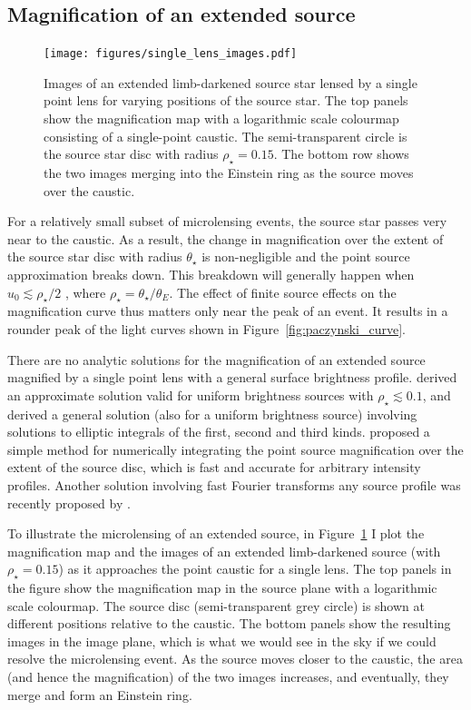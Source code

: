 \documentclass[12pt,dvipsnames]{report}
\begin{document}
\subsection{Magnification of an extended source}
\begin{figure}[t]
    \begin{centering}
        \texttt{[image: figures/single\_lens\_images.pdf]}
        \caption{Images of an extended limb-darkened source star lensed by a single
            point lens for varying positions of the source star. The top panels show the magnification map with a logarithmic scale
            colourmap  consisting of a single-point caustic. The semi-transparent circle
            is the source star disc with radius $\rho_\star=0.15$. The bottom row shows
            the two images merging into the Einstein ring as the source moves over the caustic.}
        \label{fig:single_lens_images}
    \end{centering}
\end{figure}
For a relatively small subset of microlensing events, the source star passes
very near to the caustic. 
As a result,  the change in magnification over the extent of
the source star disc with radius $\theta_\star$ is non-negligible and the point source
approximation breaks down. 
This breakdown will generally happen when $u_0 \lesssim
    \rho_\star/2$ \citep{1997ApJ...477..580G}, where
$\rho_\star=\theta_\star/\theta_E$. The effect of finite source effects on the
magnification curve thus matters only near the peak of an event.
It results in a rounder peak of the light curves shown in Figure~\ref{fig:paczynski_curve}.

There are no analytic solutions for the magnification of an
extended source magnified by a single point lens with a general surface brightness
profile. \citet{1994ApJ...421L..71G} derived an approximate solution valid for
uniform brightness sources with $\rho_\star\lesssim 0.1$, and
\citet{1994ApJ...430..505W} derived a general solution (also for a uniform
brightness source) involving solutions to elliptic integrals of the first,
second and third kinds. \citet{2009ApJ...695..200L} proposed a simple method for
numerically integrating the point source magnification over the extent of the source
disc, which is fast and accurate for arbitrary intensity profiles.
Another solution involving fast Fourier transforms any source profile was
recently proposed by \citet{2022arXiv220306637S}.

To illustrate the microlensing of an extended source,
in Figure~\ref{fig:single_lens_images} I plot the magnification map and the
images of an extended limb-darkened source (with $\rho_\star=0.15$) as it
approaches the point caustic for a single lens. The top panels in the figure show the
magnification map in the source plane with a logarithmic scale colourmap. The
source disc (semi-transparent grey circle) is shown at different positions
relative to the caustic. The bottom panels show the resulting images in the
image plane, which is what we would see in the sky if we could resolve the
microlensing event. As the source moves closer to the caustic, the area (and
hence the magnification) of the two images increases, and eventually,  they merge
and form an Einstein ring.
\end{document}
